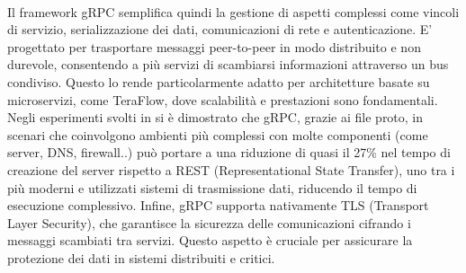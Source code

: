 \\Il framework gRPC semplifica quindi la gestione di aspetti complessi come vincoli di servizio, serializzazione dei dati, comunicazioni di rete e autenticazione.
E' progettato per trasportare messaggi peer-to-peer in modo distribuito e non durevole, consentendo a più servizi di scambiarsi informazioni attraverso un bus condiviso.
Questo lo rende particolarmente adatto per architetture basate su microservizi, come TeraFlow, dove scalabilità e prestazioni sono fondamentali.
\\Negli esperimenti svolti in \cite{espgrpc} si è dimostrato che gRPC, grazie ai file proto, in scenari che coinvolgono ambienti più complessi con molte componenti (come server, DNS, firewall..)
può portare a una riduzione di quasi il 27\% nel tempo di creazione del server rispetto a REST (Representational State Transfer), uno tra i più moderni e utilizzati sistemi di trasmissione dati, riducendo il tempo di esecuzione complessivo.
Infine, gRPC supporta nativamente TLS (Transport Layer Security), che garantisce la sicurezza delle comunicazioni cifrando i messaggi scambiati tra servizi.
Questo aspetto è cruciale per assicurare la protezione dei dati in sistemi distribuiti e critici.


